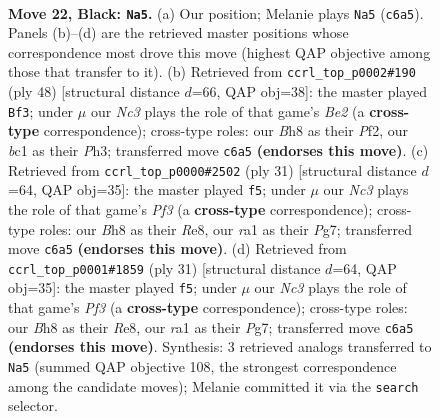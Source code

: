 \documentclass[11pt]{article}
\begin{document}
\clearpage

\begin{figure}[p]\centering
\begin{subfigure}{0.46\textwidth}\centering
\resizebox{\linewidth}{!}{%
\newchessgame
\chessboard[
  setfen={r4r1b/1ppb1k2/p1n5/4pp1p/2P5/P1N2N2/1PB1KPP1/R1B3R1 b - - 0 22},
  showmover=false,
  pgfstyle=straightmove, color=movearrow, markmove={c6-a5}
]}
\caption{}
\end{subfigure}\hfill
\begin{subfigure}{0.46\textwidth}\centering
\resizebox{\linewidth}{!}{%
\newchessgame
\chessboard[
  setfen={2rr2k1/pp3pp1/5n1p/2np4/3N2P1/1P2P2P/P3BP2/R2R2K1 w - - 0 25},
  showmover=false,
  pgfstyle=straightmove, color=movearrow, markmove={e2-f3}
]}
\caption{}
\end{subfigure}
\\[4pt]
\begin{subfigure}{0.46\textwidth}\centering
\resizebox{\linewidth}{!}{%
\newchessgame
\chessboard[
  setfen={1k1rr3/pp2bppp/4bp2/8/1Pp5/P1N2N2/4BPPP/R3K2R b KQ - 6 16},
  showmover=false,
  pgfstyle=straightmove, color=movearrow, markmove={f6-f5}
]}
\caption{}
\end{subfigure}\hfill
\begin{subfigure}{0.46\textwidth}\centering
\resizebox{\linewidth}{!}{%
\newchessgame
\chessboard[
  setfen={1k1rr3/pp2bppp/4bp2/8/1Pp5/P1N2N2/4BPPP/R3K2R b KQ - 6 16},
  showmover=false,
  pgfstyle=straightmove, color=movearrow, markmove={f6-f5}
]}
\caption{}
\end{subfigure}
\caption{\textbf{Move 22, Black: \texttt{Na5}.} (a) Our position; Melanie plays \texttt{Na5} (\texttt{c6a5}). Panels (b)--(d) are the retrieved master positions whose correspondence most drove this move (highest QAP objective among those that transfer to it). (b) Retrieved from \texttt{ccrl\_top\_p0002\#190} (ply 48) [structural distance $d$=66, QAP obj=38]: the master played \texttt{Bf3}; under $\mu$ our \emph{Nc3} plays the role of that game's \emph{Be2} (a \textbf{cross-type} correspondence); cross-type roles: our \emph{B}h8 as their \emph{P}f2, our \emph{b}c1 as their \emph{P}h3; transferred move \texttt{c6a5} \textbf{(endorses this move)}. (c) Retrieved from \texttt{ccrl\_top\_p0000\#2502} (ply 31) [structural distance $d$=64, QAP obj=35]: the master played \texttt{f5}; under $\mu$ our \emph{Nc3} plays the role of that game's \emph{Pf3} (a \textbf{cross-type} correspondence); cross-type roles: our \emph{B}h8 as their \emph{R}e8, our \emph{r}a1 as their \emph{P}g7; transferred move \texttt{c6a5} \textbf{(endorses this move)}. (d) Retrieved from \texttt{ccrl\_top\_p0001\#1859} (ply 31) [structural distance $d$=64, QAP obj=35]: the master played \texttt{f5}; under $\mu$ our \emph{Nc3} plays the role of that game's \emph{Pf3} (a \textbf{cross-type} correspondence); cross-type roles: our \emph{B}h8 as their \emph{R}e8, our \emph{r}a1 as their \emph{P}g7; transferred move \texttt{c6a5} \textbf{(endorses this move)}. Synthesis: 3 retrieved analogs transferred to \texttt{Na5} (summed QAP objective 108, the strongest correspondence among the candidate moves); Melanie committed it via the \texttt{search} selector.}
\label{fig:thought-m43}
\end{figure}
\end{document}
